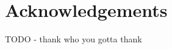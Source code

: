 
\onehalfspacing\raggedright %

\section*{\Huge{Acknowledgements}}

TODO - thank who you gotta thank